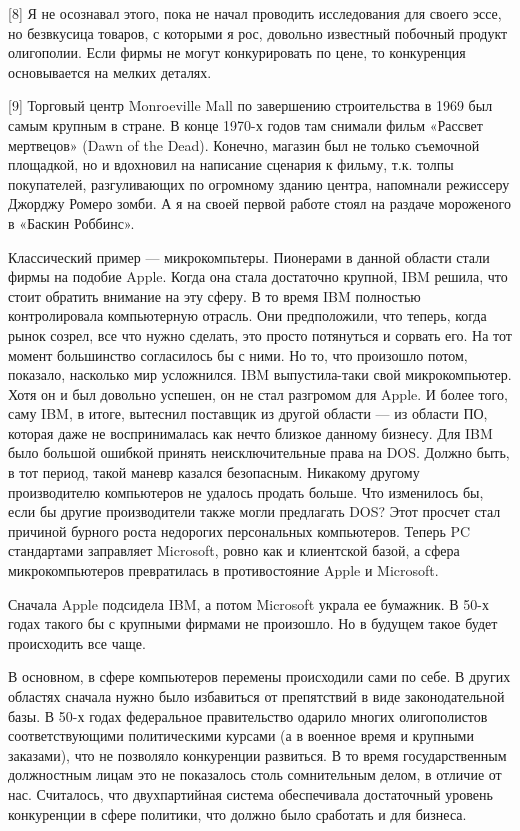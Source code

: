 \documentclass[ebook,12pt,oneside,openany]{memoir}
\begin{document}
[8] Я не осознавал этого, пока не начал проводить исследования для
своего эссе, но безвкусица товаров, с которыми я рос, довольно
известный побочный продукт олигополии. Если фирмы не могут
конкурировать по цене, то конкуренция основывается на мелких деталях. \newline

[9] Торговый центр Monroeville Mall по завершению строительства в 1969
был самым крупным в стране. В конце 1970-х годов там снимали фильм
«Рассвет мертвецов» (Dawn of the Dead). Конечно, магазин был не только
съемочной площадкой, но и вдохновил на написание сценария к фильму,
т.к. толпы покупателей, разгуливающих по огромному зданию центра,
напомнали режиссеру Джорджу Ромеро зомби. А я на своей первой работе
стоял на раздаче мороженого в «Баскин Роббинс». \newline

Классический пример — микрокомпьтеры. Пионерами в данной области стали
фирмы на подобие Apple. Когда она стала достаточно крупной, IBM
решила, что стоит обратить внимание на эту сферу. В то время IBM
полностью контролировала компьютерную отрасль. Они предположили, что
теперь, когда рынок созрел, все что нужно сделать, это просто
потянуться и сорвать его. На тот момент большинство согласилось бы с
ними. Но то, что произошло потом, показало, насколько мир усложнился.
IBM выпустила-таки свой микрокомпьютер. Хотя он и был довольно
успешен, он не стал разгромом для Apple. И более того, саму IBM, в
итоге, вытеснил поставщик из другой области — из области ПО, которая
даже не воспринималась как нечто близкое данному бизнесу. Для IBM было
большой ошибкой принять неисключительные права на DOS. Должно быть, в
тот период, такой маневр казался безопасным. Никакому другому
производителю компьютеров не удалось продать больше. Что изменилось
бы, если бы другие производители также могли предлагать DOS? Этот
просчет стал причиной бурного роста недорогих персональных
компьютеров. Теперь PC стандартами заправляет Microsoft, ровно как и
клиентской базой, а сфера микрокомпьютеров превратилась в
противостояние Apple и Microsoft. \newline

Сначала Apple подсидела IBM, а потом Microsoft украла ее
бумажник. В 50-х годах такого бы с крупными фирмами не произошло. Но в
будущем такое будет происходить все чаще. \newline

В основном, в сфере компьютеров перемены происходили сами по себе. В
других областях сначала нужно было избавиться от препятствий в виде
законодательной базы. В 50-х годах федеральное правительство одарило
многих олигополистов соответствующими политическими курсами (а в
военное время и крупными заказами), что не позволяло конкуренции
развиться. В то время государственным должностным лицам это не
показалось столь сомнительным делом, в отличие от нас. Считалось, что
двухпартийная система обеспечивала достаточный уровень конкуренции в
сфере политики, что должно было сработать и для бизнеса. \newline
\end{document}
